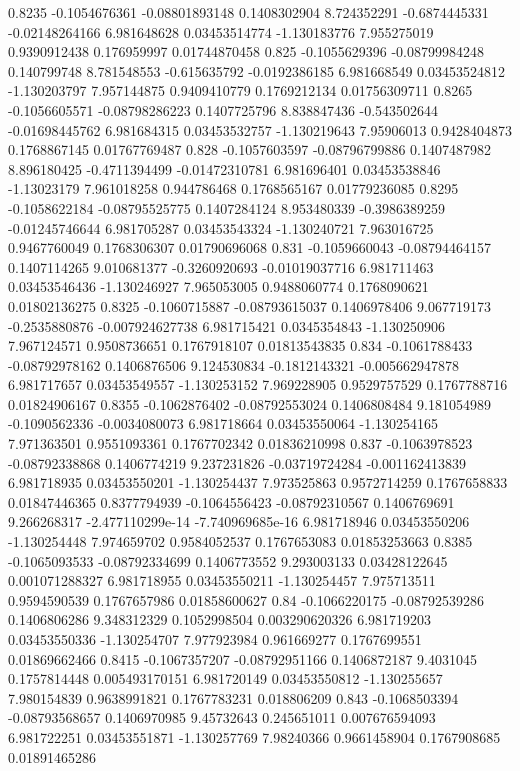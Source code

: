{0.8235 -0.1054676361 -0.08801893148 0.1408302904 8.724352291 -0.6874445331 -0.02148264166 6.981648628 0.03453514774 -1.130183776 7.955275019 0.9390912438 0.176959997 0.01744870458
0.825 -0.1055629396 -0.08799984248 0.140799748 8.781548553 -0.615635792 -0.0192386185 6.981668549 0.03453524812 -1.130203797 7.957144875 0.9409410779 0.1769212134 0.01756309711
0.8265 -0.1056605571 -0.08798286223 0.1407725796 8.838847436 -0.543502644 -0.01698445762 6.981684315 0.03453532757 -1.130219643 7.95906013 0.9428404873 0.1768867145 0.01767769487
0.828 -0.1057603597 -0.08796799886 0.1407487982 8.896180425 -0.4711394499 -0.01472310781 6.981696401 0.03453538846 -1.13023179 7.961018258 0.944786468 0.1768565167 0.01779236085
0.8295 -0.1058622184 -0.08795525775 0.1407284124 8.953480339 -0.3986389259 -0.01245746644 6.981705287 0.03453543324 -1.130240721 7.963016725 0.9467760049 0.1768306307 0.01790696068
0.831 -0.1059660043 -0.08794464157 0.1407114265 9.010681377 -0.3260920693 -0.01019037716 6.981711463 0.03453546436 -1.130246927 7.965053005 0.9488060774 0.1768090621 0.01802136275
0.8325 -0.1060715887 -0.08793615037 0.1406978406 9.067719173 -0.2535880876 -0.007924627738 6.981715421 0.0345354843 -1.130250906 7.967124571 0.9508736651 0.1767918107 0.01813543835
0.834 -0.1061788433 -0.08792978162 0.1406876506 9.124530834 -0.1812143321 -0.005662947878 6.981717657 0.03453549557 -1.130253152 7.969228905 0.9529757529 0.1767788716 0.01824906167
0.8355 -0.1062876402 -0.08792553024 0.1406808484 9.181054989 -0.1090562336 -0.0034080073 6.981718664 0.03453550064 -1.130254165 7.971363501 0.9551093361 0.1767702342 0.01836210998
0.837 -0.1063978523 -0.08792338868 0.1406774219 9.237231826 -0.03719724284 -0.001162413839 6.981718935 0.03453550201 -1.130254437 7.973525863 0.9572714259 0.1767658833 0.01847446365
0.8377794939 -0.1064556423 -0.08792310567 0.1406769691 9.266268317 -2.477110299e-14 -7.740969685e-16 6.981718946 0.03453550206 -1.130254448 7.974659702 0.9584052537 0.1767653083 0.01853253663
0.8385 -0.1065093533 -0.08792334699 0.1406773552 9.293003133 0.03428122645 0.001071288327 6.981718955 0.03453550211 -1.130254457 7.975713511 0.9594590539 0.1767657986 0.01858600627
0.84 -0.1066220175 -0.08792539286 0.1406806286 9.348312329 0.1052998504 0.003290620326 6.981719203 0.03453550336 -1.130254707 7.977923984 0.961669277 0.1767699551 0.01869662466
0.8415 -0.1067357207 -0.08792951166 0.1406872187 9.4031045 0.1757814448 0.005493170151 6.981720149 0.03453550812 -1.130255657 7.980154839 0.9638991821 0.1767783231 0.018806209
0.843 -0.1068503394 -0.08793568657 0.1406970985 9.45732643 0.245651011 0.007676594093 6.981722251 0.03453551871 -1.130257769 7.98240366 0.9661458904 0.1767908685 0.01891465286
}
